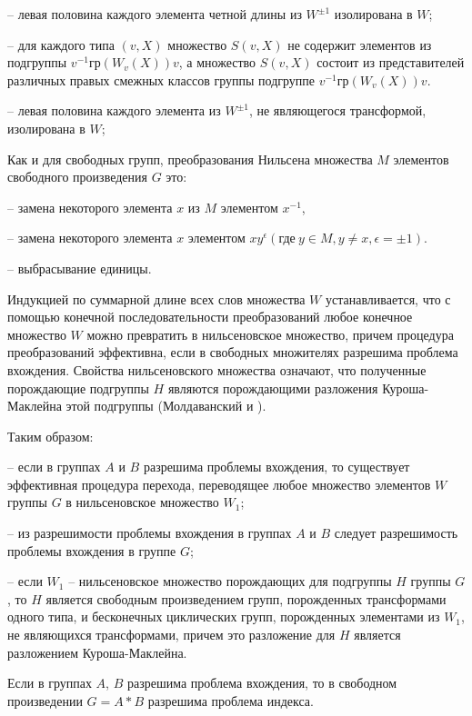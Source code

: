 \documentclass[twoside]{mfitjournal}
\begin{document}
– левая половина каждого элемента четной длины из $W^{\pm 1}$ изолирована в $W$;

– для каждого типа $(v, X)$ множество $S(v, X)$ не содержит элементов из подгруппы $v^{-1}\text{гр}(W_v(X))v$, а множество $S(v, X)$ состоит из представителей различных правых смежных классов группы подгруппе $v^{-1}\text{гр}(W_v(X))v$.

– левая половина каждого элемента из $W^{\pm 1}$, не являющегося трансформой, изолирована в $W$;

Как и для свободных групп,  преобразования Нильсена множества $M$ элементов свободного произведения  $G$ это: 

– замена некоторого элемента $x$ из $M$ элементом $x^{-1}$,
 
– замена некоторого элемента $x$ элементом $xy^\epsilon  (\text{где}~ y \in M, y\neq x, \epsilon = \pm 1)$.

– выбрасывание единицы. 

Индукцией по суммарной длине всех слов множества $W$ устанавливается, что с помощью конечной последовательности преобразований любое конечное множество $W$ можно превратить в нильсеновское множество, причем процедура преобразований эффективна, если в свободных множителях разрешима проблема вхождения. Свойства нильсеновского множества означают, что полученные порождающие подгруппы $H$  являются  порождающими разложения Куроша- Маклейна этой подгруппы (Молдаванский \cite{Mol1} и \cite{Mol2}). 

Таким образом:

–  если в группах $A$ и $B$ разрешима проблемы вхождения, то существует эффективная процедура перехода, переводящее любое множество элементов $W$ группы $G$ в нильсеновское множество $W_1$;

–  из разрешимости проблемы вхождения в группах $A$ и $B$ следует разрешимость проблемы вхождения в группе $G$;

–  если $W_1$ -- нильсеновское множество порождающих для подгруппы $H$ группы $G$, то $H$ является свободным произведением групп, порожденных трансформами одного типа, и бесконечных циклических групп, порожденных элементами из $W_1$, не являющихся трансформами, причем это разложение для $H$ является разложением Куроша-Маклейна.

\begin{theorem}[2]
\label{t2}
Если в группах $A$, $B$  разрешима проблема вхождения, то в свободном произведении $G = A\ast B$ разрешима проблема индекса.
\end{theorem}
\end{document}
